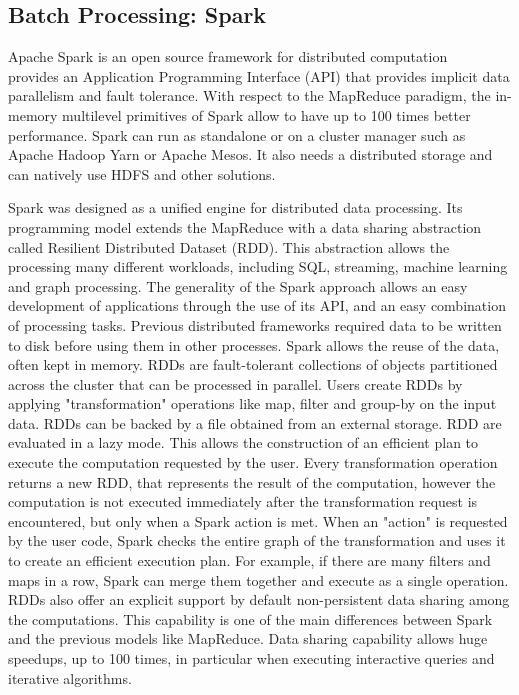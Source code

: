 \subsection{Batch Processing: Spark}\label{sec:spark}
Apache Spark is an open source framework for distributed computation 
~\cite{misc:ApacheSpark} provides an Application Programming Interface (API) that provides implicit data parallelism and fault tolerance. With respect to the MapReduce paradigm, the in-memory multilevel primitives of Spark allow to have up to 100 times better performance. Spark can run as standalone or on a cluster manager such as Apache Hadoop Yarn or Apache Mesos. It also needs a distributed storage and can natively use HDFS and other solutions. 

Spark was designed as a unified engine for distributed data processing. Its programming model extends the MapReduce with a data sharing abstraction called Resilient Distributed Dataset (RDD). This abstraction allows the processing many different workloads, including SQL, streaming, machine learning and graph processing. The generality of the Spark approach allows an easy development of applications through the use of its API, and an easy combination of  processing tasks. Previous distributed frameworks required data to be written to disk before using them in other processes. Spark allows the reuse of the data, often kept in memory.
RDDs are fault-tolerant collections of objects partitioned across the cluster that can be processed in parallel. Users create RDDs by applying "transformation" operations like map, filter and group-by on the input data. RDDs can be backed by a file obtained from an external storage. RDD are evaluated in a lazy mode. This allows the construction of an efficient plan to execute the computation requested by the user. Every transformation operation returns a new RDD, that represents the result of the computation, however the computation is not executed immediately after the transformation request is encountered, but only when a Spark action is met. When an "action" is requested by the user code, Spark checks the entire graph of the transformation and uses it to create an efficient execution plan. For example, if there are many filters and maps in a row, Spark can merge them together and execute as a single operation.
RDDs also offer an explicit support by default non-persistent data sharing among the computations. This capability is one of the main differences between Spark and the previous  models like MapReduce. Data sharing capability allows huge speedups, up to 100 times, in particular when executing interactive queries and iterative algorithms.

